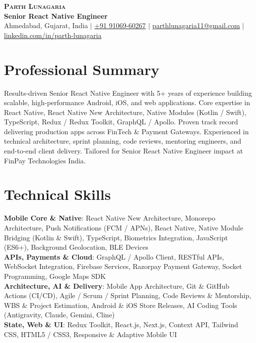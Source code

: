 \documentclass[letterpaper,10.5pt]{article}
\begin{document}
\begin{center}
  {\Huge \scshape \textbf{\color{accentColor}Parth Lunagaria}} \\ \vspace{3pt}
  {\small \textbf{Senior React Native Engineer}} \\ \vspace{3pt}
  \small
  Ahmedabad, Gujarat, India $|$
  \href{tel:+919106960267}{+91 91069-60267} $|$
  \href{mailto:parthlunagaria11@gmail.com}{parthlunagaria11@gmail.com} $|$
  \href{https://www.linkedin.com/in/parth-lunagaria}{linkedin.com/in/parth-lunagaria}
\end{center}
\vspace{-10pt}

\section{Professional Summary}
\small{Results-driven Senior React Native Engineer with 5+ years of experience building scalable, high-performance Android, iOS, and web applications. Core expertise in React Native, React Native New Architecture, Native Modules (Kotlin / Swift), TypeScript, Redux / Redux Toolkit, GraphQL / Apollo. Proven track record delivering production apps across FinTech \& Payment Gateways. Experienced in technical architecture, sprint planning, code reviews, mentoring engineers, and end-to-end client delivery. Tailored for Senior React Native Engineer impact at FinPay Technologies India.}
\vspace{-4pt}

\section{Technical Skills}
\begin{itemize}[leftmargin=0.0in, label={}]
  \small{\item{
  \textbf{Mobile Core \& Native}: React Native New Architecture, Monorepo Architecture, Push Notifications (FCM / APNs), React Native, Native Module Bridging (Kotlin \& Swift), TypeScript, Biometrics Integration, JavaScript (ES6+), Background Geolocation, BLE Devices \\
  \textbf{APIs, Payments \& Cloud}: GraphQL / Apollo Client, RESTful APIs, WebSocket Integration, Firebase Services, Razorpay Payment Gateway, Socket Programming, Google Maps SDK \\
  \textbf{Architecture, AI \& Delivery}: Mobile App Architecture, Git \& GitHub Actions (CI/CD), Agile / Scrum / Sprint Planning, Code Reviews \& Mentorship, WBS \& Project Estimation, Android \& iOS Store Releases, AI Coding Tools (Antigravity, Claude, Gemini, Cline) \\
  \textbf{State, Web \& UI}: Redux Toolkit, React.js, Next.js, Context API, Tailwind CSS, HTML5 / CSS3, Responsive \& Adaptive Mobile UI
  }}
\end{itemize}
\vspace{-10pt}
\end{document}
